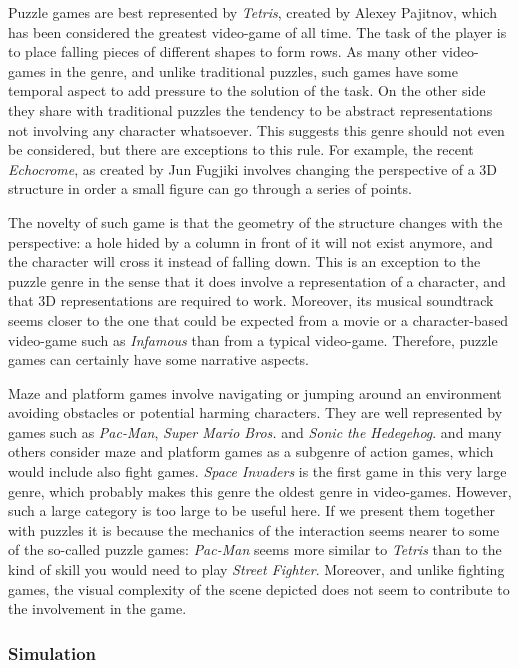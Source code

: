 \documentclass[
		twoside,openright,titlepage,numbers=noenddot,manychapters,
		headinclude,%
                footinclude=false,cleardoublepage=empty,
                BCOR=5mm,
		fontsize=11pt, %
                 enabledeprecatedfontcommands]{scrreprt}
\begin{document}
Puzzle games are best represented by \emph{Tetris}, created by Alexey Pajitnov, which has been considered the greatest video-game of all time. The task of the player is to place falling pieces of different shapes to form rows. As many other video-games in the genre, and unlike traditional puzzles, such games have some temporal aspect to add pressure to the solution of the task. On the other side they share with traditional puzzles the tendency to be abstract representations not involving any character whatsoever. This suggests this genre should not even be considered, but there are exceptions to this rule. For example, the recent \emph{Echocrome}, as created by Jun Fugjiki involves changing the perspective of a 3D structure in order a small figure can go through a series of points.  

The novelty of such game is that the geometry of the structure changes with the perspective: a hole hided by a column in front of it will not exist anymore, and the character will cross it instead of falling down. This is an exception to the puzzle genre in the sense that it does involve a representation of a character, and that 3D representations are required to work. Moreover, its musical soundtrack seems closer to the one that could be expected from a movie or a character-based video-game such as \emph{Infamous} than from a typical video-game. Therefore,  puzzle games can certainly have some narrative aspects.

Maze and platform games involve navigating or jumping around an environment avoiding obstacles or potential harming characters. They are well represented by games such as \emph{Pac-Man}, \emph{Super Mario Bros.} and \emph{Sonic the Hedegehog}. \cite{crawford1984art} and many others consider maze and platform games as a subgenre of action games, which would include also fight games. \emph{Space Invaders} is the first game in this very large genre, which probably makes this genre the oldest genre in video-games. However, such a large category is too large to be useful here. If we present them together with puzzles it is  because the mechanics of the interaction seems nearer to some of the so-called puzzle games: \emph{Pac-Man} seems more similar to \emph{Tetris} than to the kind of skill you would need to play \emph{Street Fighter}. Moreover, and unlike fighting games, the visual complexity of the scene depicted does not seem to contribute to the involvement in the game. 



\subsubsection{Simulation}
\end{document}
